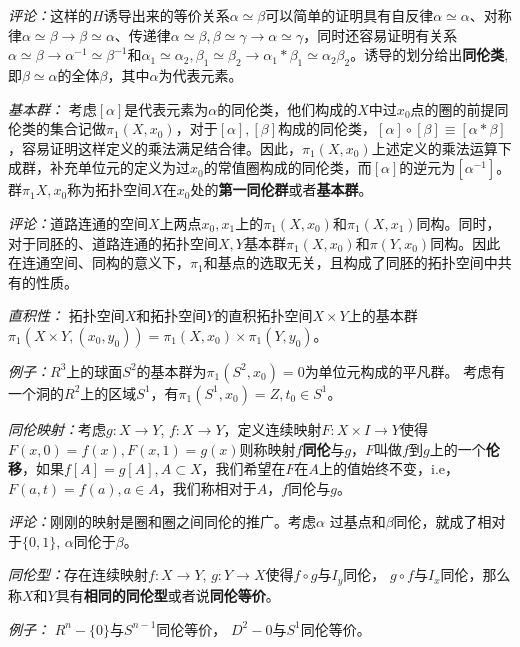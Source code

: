 \documentclass[supercite]{HustGraduPaper}
\begin{document}
\begin{appendices}
		\textit{评论：}这样的$H$诱导出来的等价关系$\alpha \simeq \beta$可以简单的证明具有自反律$\alpha \simeq \alpha$、对称律$\alpha \simeq \beta \to \beta \simeq \alpha$、传递律$\alpha \simeq \beta, \beta\simeq\gamma \to \alpha \simeq \gamma$，同时还容易证明有关系$\alpha \simeq \beta \to \alpha^{-1} \simeq \beta^{-1}$和$\alpha_1 \simeq \alpha_2, \beta_1 \simeq \beta_2 \to \alpha_1 *\beta_1 \simeq \alpha_2 \beta_2$。诱导的划分给出\textbf{同伦类},即$\beta\simeq\alpha$的全体$\beta$，其中$\alpha$为代表元素。
		
		\textit{基本群：} 考虑$[\alpha]$是代表元素为$\alpha$的同伦类，他们构成的$X$中过$x_0$点的圈的前提同伦类的集合记做$\pi_1(X,x_0)$，对于$[\alpha], [\beta]$构成的同伦类，$[\alpha] \circ [\beta] \equiv [\alpha * \beta]$，容易证明这样定义的乘法满足结合律。因此，$\pi_1(X,x_0)$上述定义的乘法运算下成群，补充单位元的定义为过$x_0$的常值圈构成的同伦类，而$[\alpha]$的逆元为$[\alpha^{-1}]$。群$\pi_1{X,x_0}$称为拓扑空间$X$在$x_0$处的\textbf{第一同伦群}或者\textbf{基本群}。
		
		\textit{评论：}道路连通的空间$X$上两点$x_0, x_1$上的$\pi_1(X,x_0)$和$\pi_1(X,x_1)$同构。同时，对于同胚的、道路连通的拓扑空间$X,Y$基本群$\pi_1(X,x_0)$和$\pi(Y,x_0)$同构。因此在连通空间、同构的意义下，$\pi_1$和基点的选取无关，且构成了同胚的拓扑空间中共有的性质。
		
		\textit{直积性：} 拓扑空间$X$和拓扑空间$Y$的直积拓扑空间$X \times Y$上的基本群$\pi_1(X\times Y,(x_0,y_0)) = \pi_1(X,x_0) \times \pi_1(Y,y_0)$。
		
		\textit{例子：}$R^3$上的球面$S^2$的基本群为$\pi_1(S^2,x_0) = {0}$为单位元构成的平凡群。 考虑有一个洞的$R^2$上的区域$S^1$，有$\pi_1(S^1,x_0) = Z, t_0 \in S^1$。
		
		\textit{同伦映射：}考虑$g: X\to Y$, $f: X \to Y$，定义连续映射$F: X\times I \to Y$使得$F(x,0) = f(x), F(x,1) = g(x)$则称映射$f$\textbf{同伦}与$g$，$F$叫做$f$到$g$上的一个\textbf{伦移}，如果$f[A] = g[A], A\subset X$，我们希望在$F$在$A$上的值始终不变，i.e，$F(a,t) = f(a), a\in A$，我们称相对于$A$，$f$同伦与$g$。
		
		\textit{评论：}刚刚的映射是圈和圈之间同伦的推广。考虑$\alpha$ 过基点和$\beta$同伦，就成了相对于$\{0,1\}$, $\alpha$同伦于$\beta$。
		
		\textit{同伦型：}存在连续映射$f:X\to Y$, $g: Y \to X$使得$f\circ g $与$I_y$同伦， $g\circ f$与$I_x$同伦，那么称$X$和$Y$具有\textbf{相同的同伦型}或者说\textbf{同伦等价}。
		
		\textit{例子：} $R^n - \{0\}$与$S^{n-1}$同伦等价， $D^2 - {0}$与$S^1$同伦等价。
		

\end{appendices}
\end{document}
